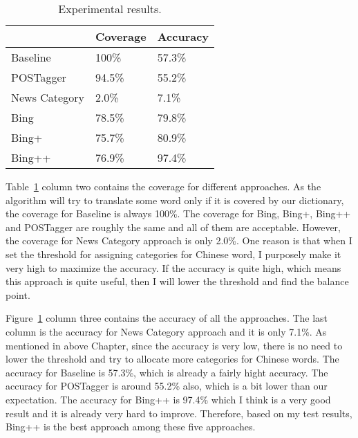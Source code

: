 \begin{CJK}{UTF8}{gbsn}
\begin{table}[ht]
  \caption{Experimental results.}
  \label{table:evaluation_1}
  \begin{tabular}{| p{2cm} | p{2cm} | p{2cm} |}
    \hline
     & Coverage & Accuracy\\
    \hline
    Baseline & 100\% & 57.3\%\\
    \hline
    POSTagger & 94.5\% & 55.2\%\\
    \hline
    News Category & 2.0\% & 7.1\%\\
    \hline
    Bing & 78.5\% & 79.8\%\\
    \hline
    Bing+ & 75.7\% & 80.9\%\\
    \hline
    Bing++ & 76.9\% & 97.4\%\\
    \hline
  \end{tabular}
\end{table}

Table~\ref{table:evaluation_1} column two contains the coverage for different approaches. As the algorithm will try to translate some word only if it is covered by our dictionary, the coverage for Baseline is always 100\%. The coverage for Bing, Bing+, Bing++ and POSTagger are roughly the same and all of them are acceptable. However, the coverage for News Category approach is only 2.0\%. One reason is that when I set the threshold for assigning categories for Chinese word, I purposely make it very high to maximize the accuracy. If the accuracy is quite high, which means this approach is quite useful, then I will lower the threshold and find the balance point.

Figure~\ref{table:evaluation_1} column three contains the accuracy of all the approaches. The last column is the accuracy for News Category approach and it is only 7.1\%. As mentioned in above Chapter, since the accuracy is very low, there is no need to lower the threshold and try to allocate more categories for Chinese words. The accuracy for Baseline is 57.3\%, which is already a fairly hight accuracy. The accuracy for  POSTagger is around 55.2\% also, which is a bit lower than our expectation. The accuracy for Bing++ is 97.4\% which I think is a very good result and it is already very hard to improve. Therefore, based on my test results, Bing++ is the best approach among these five approaches.


\end{CJK}